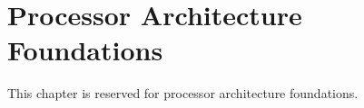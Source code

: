 \chapter{Processor Architecture Foundations}
\label{chap:processor-foundations}

This chapter is reserved for processor architecture foundations.

